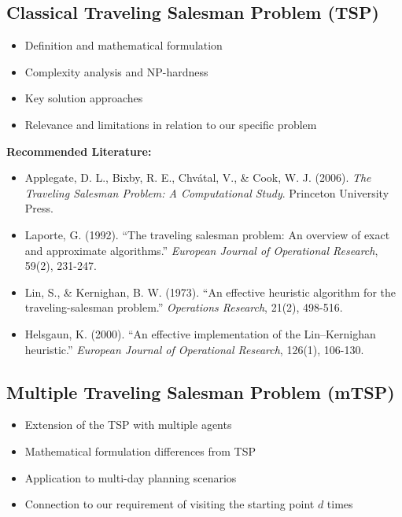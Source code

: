 \textcite{gavalas2014mobile}



\subsection{Classical Traveling Salesman Problem (TSP)}
\begin{itemize}
    \item Definition and mathematical formulation
    \item Complexity analysis and NP-hardness
    \item Key solution approaches
    \item Relevance and limitations in relation to our specific problem
\end{itemize}

\noindent\textbf{Recommended Literature:}
\begin{itemize}
    \item Applegate, D. L., Bixby, R. E., Chvátal, V., \& Cook, W. J. (2006). \textit{The Traveling Salesman Problem: A Computational Study}. Princeton University Press.
    \item Laporte, G. (1992). ``The traveling salesman problem: An overview of exact and approximate algorithms.'' \textit{European Journal of Operational Research}, 59(2), 231-247.
    \item Lin, S., \& Kernighan, B. W. (1973). ``An effective heuristic algorithm for the traveling-salesman problem.'' \textit{Operations Research}, 21(2), 498-516.
    \item Helsgaun, K. (2000). ``An effective implementation of the Lin–Kernighan heuristic.'' \textit{European Journal of Operational Research}, 126(1), 106-130.
\end{itemize}

\subsection{Multiple Traveling Salesman Problem (mTSP)}
\begin{itemize}
    \item Extension of the TSP with multiple agents
    \item Mathematical formulation differences from TSP
    \item Application to multi-day planning scenarios
    \item Connection to our requirement of visiting the starting point $d$ times
\end{itemize}

